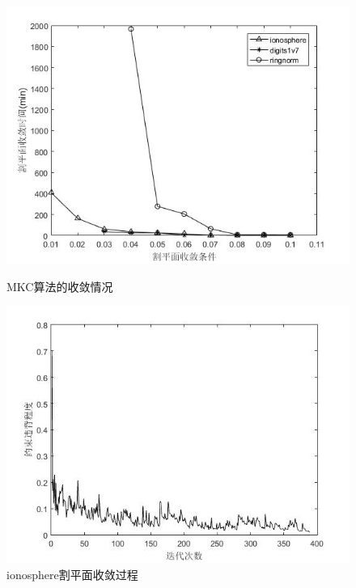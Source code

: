 \begin{figure}[H]
  \centering
  \begin{minipage}[t]{0.45\linewidth}
\includegraphics[width=\textwidth]{figure/time.jpg}
  \caption{MKC算法的收敛情况}
  \label{fig:time}
  \end{minipage}
  \begin{minipage}[t]{0.45\linewidth}
\includegraphics[width=\textwidth]{figure/ionosphere_xi.jpg}
  \caption{ionosphere割平面收敛过程}
  \label{fig:ionosphere-xi}
  \end{minipage}
  \begin{minipage}[t]{0.45\linewidth}

\end{minipage}
\end{figure}
